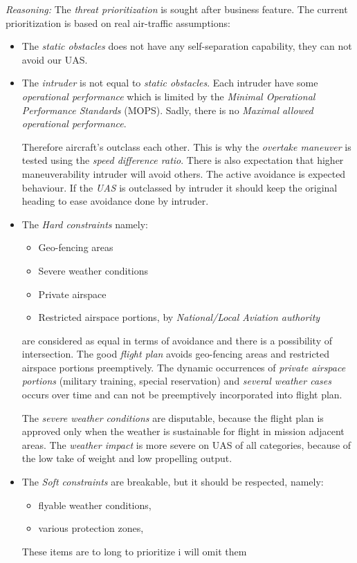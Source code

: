 \noindent\emph{Reasoning:} The \emph{threat prioritization} is sought after business feature. The current prioritization is based on real air-traffic assumptions:
\begin{itemize}
    \item The \emph{static obstacles} does not have any self-separation capability, they can not avoid our UAS.
    
    \item The \emph{intruder} is not equal to \emph{static obstacles}. Each intruder have some \emph{operational performance} which is limited by the \emph{Minimal Operational Performance Standards} (MOPS). Sadly, there is no \emph{Maximal allowed operational performance}.
    
    Therefore aircraft's outclass each other. This is why the \emph{overtake maneuver} is tested using the \emph{speed difference ratio}. There is also expectation that higher maneuverability intruder will avoid others. The active avoidance is expected behaviour. If the \emph{UAS} is outclassed by intruder it should keep the original heading to ease avoidance done by intruder.
    
    \item The \emph{Hard constraints} namely:
    
    \begin{itemize}
        \item Geo-fencing areas 
        \item Severe weather conditions
        \item Private airspace
        \item Restricted airspace portions, by \emph{National/Local Aviation authority}
    \end{itemize}
    
    are considered as equal in terms of avoidance and there is a possibility of intersection. The good \emph{flight plan} avoids geo-fencing areas and restricted airspace portions preemptively. The dynamic occurrences of \emph{private airspace portions} (military training, special reservation) and \emph{several weather cases} occurs over time and can not be preemptively incorporated into flight plan.
    
    The \emph{severe weather conditions} are disputable, because the flight plan is approved only when the weather is sustainable for flight in mission adjacent areas. The \emph{weather impact} is more severe on UAS of all categories, because of the low take of weight and low propelling output. 
    
    \item The \emph{Soft constraints} are breakable, but it should be respected, namely:
    \begin{itemize}
        \item flyable weather conditions,
        \item various protection zones,
    \end{itemize}
    These items are to long to prioritize i will omit them
\end{itemize}

